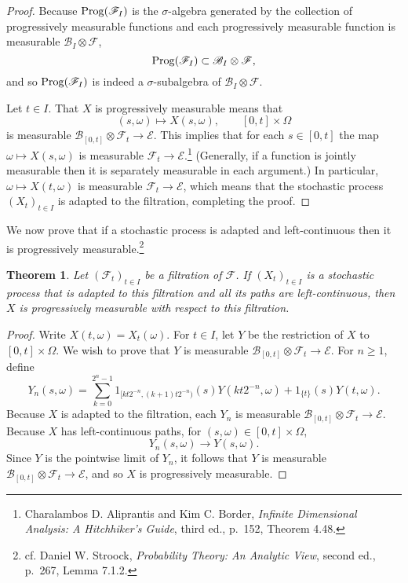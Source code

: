 \documentclass{article}
\newcommand{\Prog}{\ensuremath\mathrm{Prog}}
\newtheorem{theorem}{Theorem}
\theoremstyle{definition}
\begin{document}
\begin{proof}
Because $\Prog(\mathscr{F}_I)$ is the $\sigma$-algebra generated by the collection
of progressively measurable functions and each progressively measurable function is measurable
$\mathscr{B}_I \otimes \mathscr{F}$, 
\[
\Prog(\mathscr{F}_I) \subset \mathscr{B}_I \otimes \mathscr{F},
\]
and so $\Prog(\mathscr{F}_I)$ is indeed a $\sigma$-subalgebra of $\mathscr{B}_I \otimes \mathscr{F}$. 

Let $t \in I$. That $X$ is progressively measurable means that 
\[
(s,\omega) \mapsto X(s,\omega), \qquad [0,t] \times \Omega
\]
is measurable $\mathscr{B}_{[0,t]} \otimes \mathscr{F}_t \to \mathscr{E}$. This implies that for each $s \in [0,t]$ the map
$\omega \mapsto X(s,\omega)$ is measurable $\mathscr{F}_t \to \mathscr{E}$.\footnote{Charalambos D. Aliprantis and Kim C. Border, {\em Infinite Dimensional Analysis:
A Hitchhiker's Guide}, third ed., p.~152, Theorem 4.48.} (Generally, if a function is jointly measurable then it is separately measurable in each argument.)
In particular, $\omega \mapsto X(t,\omega)$ is measurable $\mathscr{F}_t \to \mathscr{E}$, which means that the stochastic process $(X_t)_{t \in I}$ is adapted
to the filtration, completing the proof.
\end{proof}


We now prove that if a stochastic process is adapted and left-continuous then it is progressively
measurable.\footnote{cf. Daniel W. Stroock, {\em Probability Theory: An Analytic View}, second ed.,
p.~267, Lemma 7.1.2.}

\begin{theorem}
Let $(\mathscr{F}_t)_{t \in I}$ be a filtration of $\mathscr{F}$. If $(X_t)_{t \in I}$ is a stochastic
process that is adapted to this filtration and all its paths are left-continuous, then $X$ is progressively measurable with respect to this filtration.
\end{theorem}
\begin{proof}
Write $X(t,\omega)=X_t(\omega)$. 
For $t \in I$,
let $Y$ be the restriction of $X$ to $[0,t] \times \Omega$. We wish to prove that $Y$ is measurable
$\mathscr{B}_{[0,t]} \otimes \mathscr{F}_t \to \mathscr{E}$. 
For $n \geq 1$, define
\[
Y_n(s,\omega) = \sum_{k=0}^{2^n-1} 1_{[kt2^{-n},(k+1)t2^{-n})}(s) Y(kt2^{-n},\omega)
+1_{\{t\}}(s) Y(t,\omega).
\]
Because $X$ is adapted to the filtration,
each $Y_n$ is measurable $\mathscr{B}_{[0,t]} \otimes \mathscr{F}_t \to \mathscr{E}$.
Because $X$ has left-continuous paths, for $(s,\omega) \in [0,t] \times \Omega$,
\[
Y_n(s,\omega) \to Y(s,\omega). 
\]
Since $Y$ is the pointwise limit of $Y_n$, it follows that $Y$ is measurable $\mathscr{B}_{[0,t]} \otimes \mathscr{F}_t \to \mathscr{E}$,
and so $X$ is progressively measurable.
\end{proof}
\end{document}
